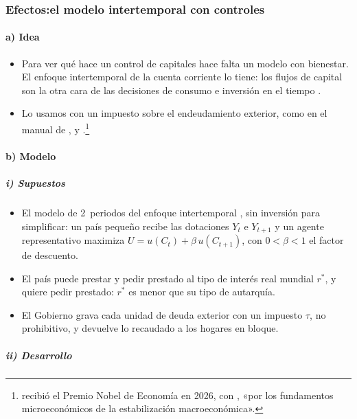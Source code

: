 \documentclass[11pt]{article}
\begin{document}
\subsubsection{Efectos:\cortetitulo el modelo intertemporal con controles}\label{sec:controles-modelo}

\paragraph{a) Idea}

\begin{itemize}
\item Para ver qué hace un control de capitales hace falta un modelo con bienestar. El enfoque intertemporal de la cuenta corriente lo tiene: los flujos de capital son la otra cara de las decisiones de consumo e inversión en el tiempo .
\item Lo usamos con un impuesto sobre el endeudamiento exterior, como en el manual de ,  y \nocite{SchmittGroheUribeWoodford2022International}.\footnote{ recibió el Premio Nobel de Economía en 2026, con , «por los fundamentos microeconómicos de la estabilización macroeconómica»\nocite{Nobel2026Prensa}.}
\end{itemize}

\paragraph{b) Modelo}

\subparagraph{i) Supuestos}

\begin{itemize}
\item El modelo de 2~periodos del enfoque intertemporal , sin inversión para simplificar: un país pequeño recibe las dotaciones $Y_t$ e $Y_{t+1}$ y un agente representativo maximiza $U=u(C_t)+\beta\,u(C_{t+1})$, con $0<\beta<1$ el factor de descuento.
\item El país puede prestar y pedir prestado al tipo de interés real mundial $r^*$, y quiere pedir prestado: $r^*$ es menor que su tipo de autarquía.
\item El Gobierno grava cada unidad de deuda exterior con un impuesto $\tau$, no prohibitivo, y devuelve lo recaudado a los hogares en bloque.
\end{itemize}

\subparagraph{ii) Desarrollo}
\end{document}
